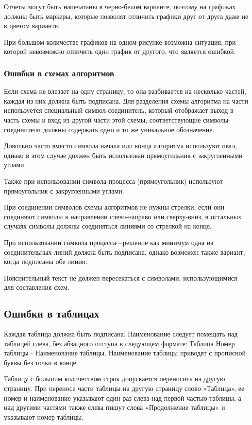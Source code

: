 Отчеты могут быть напечатаны в черно-белом варианте, поэтому на графиках должны быть маркеры, которые позволят отличить графики друг от друга даже не в цветом варианте.

При большом количестве графиков на одном рисунке возможна ситуация, при которой невозможно отличить один график от другого, что является ошибкой.

\subsubsection{Ошибки в схемах алгоритмов}
Если схема не влезает на одну страницу, то она разбивается на несколько частей, каждая из них должна быть подписана. Для разделения схемы алгоритма на части используется специальный символ-соединитель, который отображает выход в часть схемы и вход из другой части этой схемы, соответствующие символы-соединители должны содержать одно и то же уникальное обозначение.

Довольно часто вместо символа начала или конца алгоритма используют овал, однако в этом случае должен быть использован прямоугольник с закругленными углами.

Также при использовании символа процесса (прямоугольник) используют прямоугольник с закругленными углами.

При соединении символов схемы алгоритмов не нужны стрелки, если они соединяют символы в направлении слево-направо или сверху-вниз, в остальных случаях символы должны соединяться линиями со стрелкой на конце.

При использовании символа процесса---решение как минимум одна из соединительных линий должна быть подписана, однако возможен также вариант, когда подписаны обе линии.

Пояснительный текст не должен пересекаться с символами, использующимися для составления схем.

\subsection{Ошибки в таблицах}
Каждая таблица должна быть подписана. Наименование следует помещать над таблицей слева, без абзацного отступа в следующем формате: Таблица Номер таблицы - Наименование таблицы. Наименование таблицы приводят с прописной буквы без точки в конце\cite{GOST732}.

Таблицу с большим количеством строк допускается переносить на другую страницу. При переносе части таблицы на другую страницу слово «Таблица», ее номер и наименование указывают один раз слева над первой частью таблицы, а над другими частями также слева пишут слова «Продолжение таблицы» и указывают номер таблицы\cite{GOST732}.

